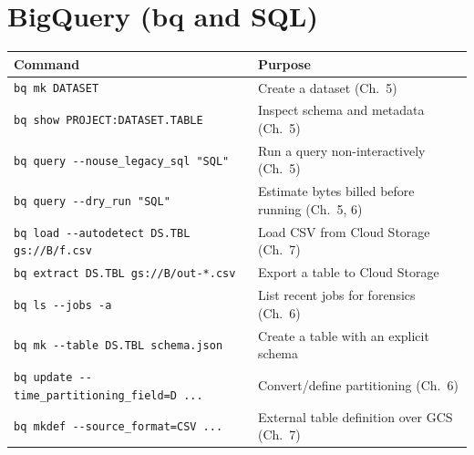 \section{BigQuery (bq and SQL)}
\begin{center}
\footnotesize
\begin{tabular}{@{}p{6.6cm}p{6.2cm}@{}}
\toprule
\textbf{Command} & \textbf{Purpose} \\
\midrule
\texttt{bq mk DATASET} & Create a dataset (Ch.~5) \\
\texttt{bq show PROJECT:DATASET.TABLE} & Inspect schema and metadata (Ch.~5) \\
\texttt{bq query -{}-nouse\_legacy\_sql "SQL"} & Run a query non-interactively (Ch.~5) \\
\texttt{bq query -{}-dry\_run "SQL"} & Estimate bytes billed before running (Ch.~5, 6) \\
\texttt{bq load -{}-autodetect DS.TBL gs://B/f.csv} & Load CSV from Cloud Storage (Ch.~7) \\
\texttt{bq extract DS.TBL gs://B/out-*.csv} & Export a table to Cloud Storage \\
\texttt{bq ls -{}-jobs -a} & List recent jobs for forensics (Ch.~6) \\
\texttt{bq mk -{}-table DS.TBL schema.json} & Create a table with an explicit schema \\
\texttt{bq update -{}-time\_partitioning\_field=D ...} & Convert/define partitioning (Ch.~6) \\
\texttt{bq mkdef -{}-source\_format=CSV ...} & External table definition over GCS (Ch.~7) \\
\bottomrule
\end{tabular}
\end{center}


